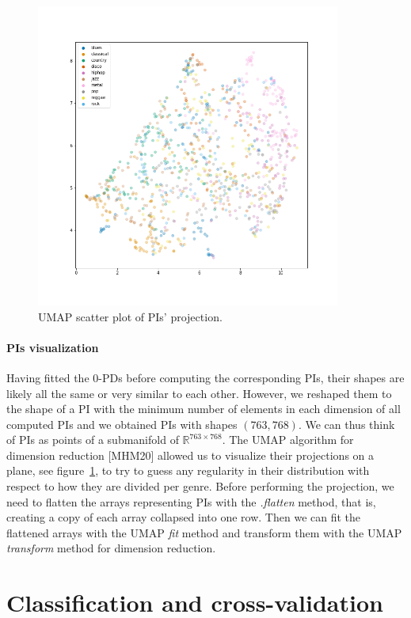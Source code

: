 \documentclass[english, LaM, oneside, noexaminfo]{sapthesis}
\begin{document}
\begin{figure}[tb]
\centering
\includegraphics[height=10cm]{umap_genres.png}
\caption{UMAP scatter plot of PIs' projection.}\label{fig:UMAPlot}
\end{figure}

 
\paragraph {PIs visualization} Having fitted the $0$-PDs before computing the corresponding PIs, their shapes are likely all the same or very similar to each other. However, we reshaped them to the shape of a PI with the minimum number of elements in each dimension of all computed PIs and we obtained PIs with shapes $(763,768)$. We can thus think of PIs as points of a submanifold of $\mathbb{R}^{763\times768}$. The UMAP algorithm for dimension reduction [MHM20] allowed us to visualize their projections on a plane, see figure~\ref{fig:UMAPlot}, to try to guess any regularity in their distribution with respect to how they are divided per genre. Before performing the projection, we need to flatten the arrays representing PIs with the \textit{.flatten} method, that is, creating a copy of each array collapsed into one row. Then we can fit the flattened arrays with the UMAP \textit{fit} method and transform them with the UMAP \textit{transform} method for dimension reduction.\\

\section{Classification and cross-validation}
\end{document}
